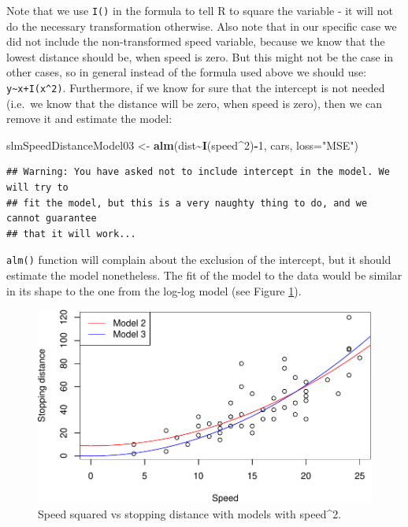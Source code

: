 \documentclass[
]{book}
\newenvironment{Shaded}{\begin{snugshade}}{\end{snugshade}}
\newcommand{\AttributeTok}[1]{\textcolor[rgb]{0.13,0.29,0.53}{#1}}
\newcommand{\DecValTok}[1]{\textcolor[rgb]{0.00,0.00,0.81}{#1}}
\newcommand{\FunctionTok}[1]{\textcolor[rgb]{0.13,0.29,0.53}{\textbf{#1}}}
\newcommand{\NormalTok}[1]{#1}
\newcommand{\OtherTok}[1]{\textcolor[rgb]{0.56,0.35,0.01}{#1}}
\newcommand{\SpecialCharTok}[1]{\textcolor[rgb]{0.81,0.36,0.00}{\textbf{#1}}}
\newcommand{\StringTok}[1]{\textcolor[rgb]{0.31,0.60,0.02}{#1}}
\theoremstyle{definition}
\theoremstyle{definition}
\theoremstyle{definition}
\theoremstyle{definition}
\theoremstyle{remark}
\begin{document}
Note that we use \texttt{I()} in the formula to tell R to square the variable - it will not do the necessary transformation otherwise. Also note that in our specific case we did not include the non-transformed speed variable, because we know that the lowest distance should be, when speed is zero. But this might not be the case in other cases, so in general instead of the formula used above we should use: \texttt{y\textasciitilde{}x+I(x\^{}2)}. Furthermore, if we know for sure that the intercept is not needed (i.e.~we know that the distance will be zero, when speed is zero), then we can remove it and estimate the model:

\begin{Shaded}
\begin{Highlighting}[]
\NormalTok{slmSpeedDistanceModel03 }\OtherTok{\textless{}{-}} \FunctionTok{alm}\NormalTok{(dist}\SpecialCharTok{\textasciitilde{}}\FunctionTok{I}\NormalTok{(speed}\SpecialCharTok{\^{}}\DecValTok{2}\NormalTok{)}\SpecialCharTok{{-}}\DecValTok{1}\NormalTok{, cars, }\AttributeTok{loss=}\StringTok{"MSE"}\NormalTok{)}
\end{Highlighting}
\end{Shaded}

\begin{verbatim}
## Warning: You have asked not to include intercept in the model. We will try to
## fit the model, but this is a very naughty thing to do, and we cannot guarantee
## that it will work...
\end{verbatim}

\texttt{alm()} function will complain about the exclusion of the intercept, but it should estimate the model nonetheless. The fit of the model to the data would be similar in its shape to the one from the log-log model (see Figure \ref{fig:speedDistanceSquare02}).

\begin{figure}
\centering
\includegraphics{Svetunkov---Statistics-for-Business-Analytics_files/figure-latex/speedDistanceSquare02-1.pdf}
\caption{\label{fig:speedDistanceSquare02}Speed squared vs stopping distance with models with speed\^{}2.}
\end{figure}
\end{document}
